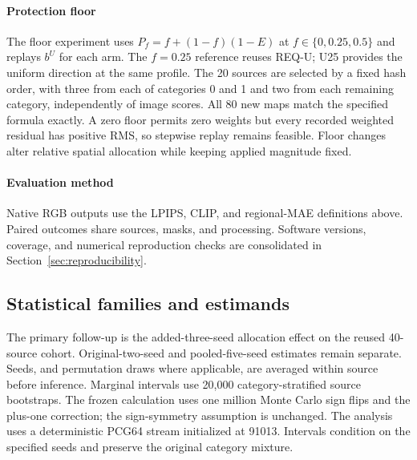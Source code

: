 \documentclass[10pt,doubleanonymous]{ieeeconf}
\begin{document}
\paragraph{Protection floor}
The floor experiment uses $P_f=f+(1-f)(1-E)$ at $f\in\{0,0.25,0.5\}$ and replays $b^U$ for each arm. The $f=0.25$ reference reuses REQ-U; U25 provides the uniform direction at the same profile. The 20 sources are selected by a fixed hash order, with three from each of categories 0 and 1 and two from each remaining category, independently of image scores. All 80 new maps match the specified formula exactly. A zero floor permits zero weights but every recorded weighted residual has positive RMS, so stepwise replay remains feasible. Floor changes alter relative spatial allocation while keeping applied magnitude fixed.

\paragraph{Evaluation method}
Native RGB outputs use the LPIPS, CLIP, and regional-MAE definitions above. Paired outcomes share sources, masks, and processing. Software versions, coverage, and numerical reproduction checks are consolidated in Section~\ref{sec:reproducibility}.

\subsection{Statistical families and estimands}
The primary follow-up is the added-three-seed allocation effect on the reused 40-source cohort. Original-two-seed and pooled-five-seed estimates remain separate. Seeds, and permutation draws where applicable, are averaged within source before inference. Marginal intervals use 20,000 category-stratified source bootstraps. The frozen calculation uses one million Monte Carlo sign flips and the plus-one correction; the sign-symmetry assumption is unchanged. The analysis uses a deterministic PCG64 stream initialized at 91013. Intervals condition on the specified seeds and preserve the original category mixture.
\end{document}
